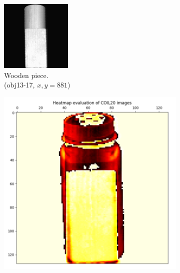 \begin{figure}[!]
     \centering
     \begin{subfigure}[t]{0.32\columnwidth}
    	\centering
    	\includegraphics[width=\columnwidth]{images/coil-20-proc/obj13__17.png}
    	\caption{Wooden piece. \\ (obj13-17, $x,y=881$)}
        \label{fig:obj13__17}
    \end{subfigure}
     \hfill
     \begin{subfigure}[t]{0.32\columnwidth}
    	\centering
    	\includegraphics[width=\columnwidth]{images/heatmap_coil20_diff.png}

\end{subfigure}
\end{figure}
